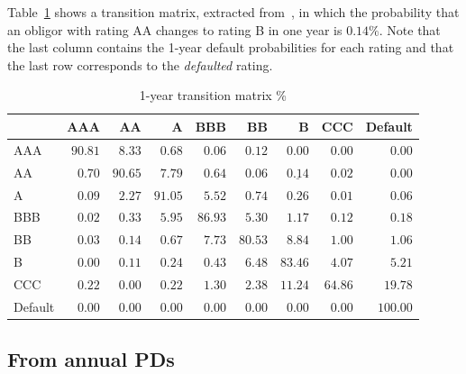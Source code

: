\documentclass[11pt,fleqn]{book} %
\begin{document}
\begin{example}
	\label{ex:1ytm}
	Table~\ref{tmatrix1} shows a transition matrix, extracted 
	from~\cite[p. 20]{cmetrics:1997}, in which the probability that an obligor 
	with rating AA changes to rating B in one year is $0.14\%$. Note that the
	last column contains the 1-year default probabilities for each rating and 
	that the last row corresponds to the \emph{defaulted} rating.
\end{example}

\begin{table}[!ht]
	\begin{center}
		\begin{tabular}[]{l|rrrrrrrr}
							& AAA     & AA      & A       & BBB     & BB      & B                  & CCC     & Default  \\
			\hline
			AAA     & $90.81$ & $8.33$  & $0.68$  & $0.06$  & $0.12$  & $0.00$             & $0.00$  & $0.00$   \\
			AA      & $0.70$  & $90.65$ & $7.79$  & $0.64$  & $0.06$  & $\underline{0.14}$ & $0.02$  & $0.00$   \\
			A       & $0.09$  & $2.27$  & $91.05$ & $5.52$  & $0.74$  & $0.26$             & $0.01$  & $0.06$   \\
			BBB     & $0.02$  & $0.33$  & $5.95$  & $86.93$ & $5.30$  & $1.17$             & $0.12$  & $0.18$   \\
			BB      & $0.03$  & $0.14$  & $0.67$  & $7.73$  & $80.53$ & $8.84$             & $1.00$  & $1.06$   \\
			B       & $0.00$  & $0.11$  & $0.24$  & $0.43$  & $6.48$  & $83.46$            & $4.07$  & $5.21$   \\
			CCC     & $0.22$  & $0.00$  & $0.22$  & $1.30$  & $2.38$  & $11.24$            & $64.86$ & $19.78$  \\
			Default & $0.00$  & $0.00$  & $0.00$  & $0.00$  & $0.00$  & $0.00$             & $0.00$  & $100.00$ \\
		\end{tabular}
		\caption{1-year transition matrix \%}
		\label{tmatrix1}
	\end{center}
\end{table}

\subsection{From annual PDs}
\label{pdfsv}
\end{document}
